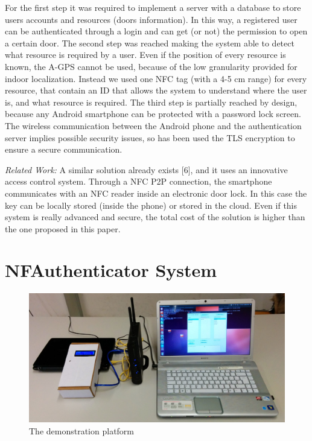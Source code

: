 \documentclass[conference]{IEEEtran}
\begin{document}
For the first step it was required to implement a server with a database to store users accounts and resources (doors information). In this way, a registered user can be authenticated through a login and can get (or not) the permission to open a certain door.
The second step was reached making the system able to detect what resource is required by a user. Even if the position of every resource is known, the A-GPS cannot be used, because of the low granularity provided for indoor localization. Instead we used one NFC tag (with a 4-5 cm range) for every resource, that contain an ID that allows the system to understand where the user is, and what resource is required.
The third step is partially reached by design, because any Android smartphone can be protected with a password lock screen. The wireless communication between the Android phone and the authentication server implies possible security issues, so has been used the TLS encryption to ensure a secure communication.

\textit{Related Work:} A similar solution already exists [6], and it uses an innovative access control system. Through a NFC P2P connection, the smartphone communicates with an NFC reader inside an electronic door lock. In this case the key can be locally stored (inside the phone) or stored in the cloud. Even if this system is really advanced and secure, the total cost of the solution is higher than the one proposed in this paper.

\section{NFAuthenticator System}

\begin{figure}[h]
\centering
\includegraphics[scale=0.08]{fig8}
\caption{The demonstration platform}
\label{architecture}
\end{figure}
\end{document}
